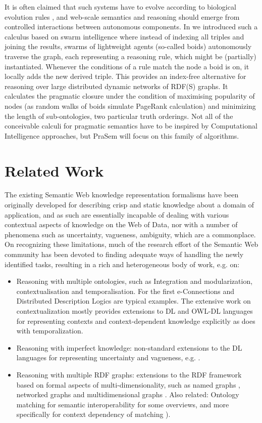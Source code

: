 \documentclass[letterpaper]{article}
\begin{document}
It is often claimed that such systems have to evolve according to biological evolution rules \cite{36}, and web-scale semantics and reasoning should emerge from controlled interactions between autonomous components. In \cite{37} we introduced such a calculus based on swarm intelligence where instead of indexing all triples and joining the results, swarms of lightweight agents (so-called boids) autonomously traverse the graph, each representing a reasoning rule, which might be (partially) instantiated. Whenever the conditions of a rule match the node a boid is on, it locally adds the new derived triple. This provides an index-free alternative for reasoning over large distributed dynamic networks of RDF(S) graphs. It calculates the pragmatic closure under the condition of maximising popularity of nodes (as random walks of boids simulate PageRank calculation) and minimizing the length of sub-ontologies, two particular truth orderings. Not all of the conceivable calculi for pragmatic semantics have to be inspired by Computational Intelligence approaches, but PraSem will focus on this family of algorithms.

\section{Related Work}

The existing Semantic Web knowledge representation formalisms have been originally developed for describing crisp and static knowledge about a domain of application, and as such are essentially incapable of dealing with various contextual aspects of knowledge on the Web of Data, nor with a number of phenomena such as uncertainty, vagueness, ambiguity, which are a commonplace. On recognizing these limitations, much of the research effort of the Semantic Web community has been devoted to finding adequate ways of handling the newly identified tasks, resulting in a rich and heterogeneous body of work, e.g. on:
\begin{itemize}
\item	Reasoning with multiple ontologies, such as Integration and modularization, contextualisation and temporalisation. For the first e-Connections \cite{7,8} and Distributed Description Logics \cite{9} are typical examples. The extensive work on contextualization mostly provides extensions to DL and OWL-DL languages for representing contexts and context-dependent knowledge explicitly \cite{10,11,12} as does \cite{13} with temporalization.
\item	Reasoning with imperfect knowledge: non-standard extensions to the DL languages for representing uncertainty and vagueness, e.g. \cite{15,17}.
\item	Reasoning with multiple RDF graphs: extensions to the RDF framework based on formal aspects of multi-dimensionality, such as named graphs \cite{18}, networked graphs \cite{19} and multidimensional graphs \cite{20}. Also related: Ontology matching for semantic interoperability \cite{21,22,23} for some overviews, and more specifically for context dependency of matching \cite{24,25,26}).
\end{itemize}
\end{document}
